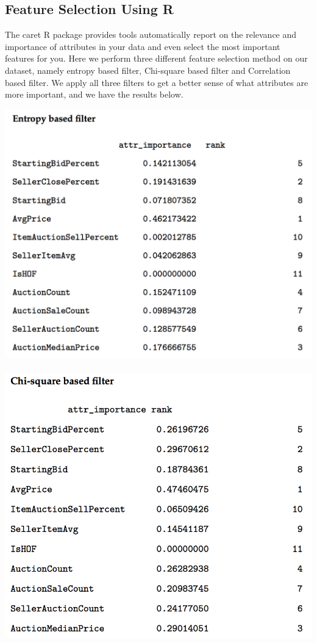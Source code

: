 \documentclass[CEJM,PDF]{cej} %
\begin{document}
\subsection{Feature Selection Using R}
The caret R package provides tools automatically report on the relevance and importance of attributes in your data and even select the most important features for you. Here we perform three different feature selection method on our dataset, namely entropy based filter, Chi-square based filter and Correlation based filter. We apply all three filters to get a better sense of what attributes are more important, and we have the results below.\\
\begin{center}
\includegraphics[scale=0.5]{entropy.png}\\
\mbox{}\\
\includegraphics[scale=0.5]{chi-square.png}\\

\end{center}
\end{document}
